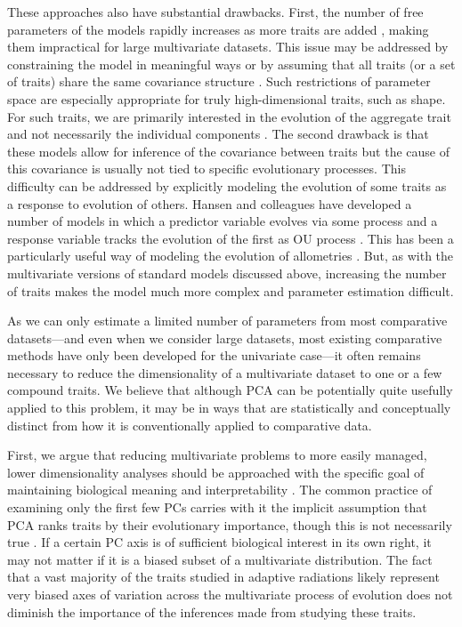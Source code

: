 \documentclass[a4paper,11pt]{article}
\begin{document}
These approaches also have substantial drawbacks. First, the number of free parameters of the models rapidly increases as more traits are added \citep{RevellHarmon2008}, making them impractical for large multivariate datasets. This issue may be addressed by constraining the model in meaningful ways \citep{ButlerKing2004} or by assuming that all traits (or a set of traits) share the same covariance structure \citep{Klingenberg2013, Adams2014, Adams2014b}. Such restrictions of parameter space are especially appropriate for truly high-dimensional traits, such as shape. For such traits, we are primarily interested in the evolution of the aggregate trait and not necessarily the individual components \citep{Adams2014}. The second drawback is that these models allow for inference of the covariance between traits but the cause of this covariance is usually not tied to specific evolutionary processes. This difficulty can be addressed by explicitly modeling the evolution of some traits as a response to evolution of others. Hansen and colleagues have developed a number of models in which a predictor variable evolves via some process and a response variable tracks the evolution of the first as OU process \citep{Hansen2008, Hansen2012SysBio, Bartoszek2012}. This has been a particularly useful way of modeling the evolution of allometries \citep[e.g.,][]{Hansen2012SysBio, Voje2013, Bolstad2014}. But, as with the multivariate versions of standard models discussed above, increasing the number of traits makes the model much more complex and parameter estimation difficult.

As we can only estimate a limited number of parameters from most comparative datasets---and even when we consider large datasets, most existing comparative methods have only been developed for the univariate case---it often remains necessary to reduce the dimensionality of a multivariate dataset to one or a few compound traits. We believe that although PCA can be potentially quite usefully applied to this problem, it may be in ways that are statistically and conceptually distinct from how it is conventionally applied to comparative data. 

First, we argue that reducing multivariate problems to more easily managed, lower dimensionality analyses should be approached with the specific goal of maintaining biological meaning and interpretability \citep{Houle2011}. The common practice of examining only the first few PCs carries with it the implicit assumption that PCA ranks traits by their evolutionary importance, though this is not necessarily true \citep{Polly2013}. If a certain PC axis is of sufficient biological interest in its own right, it may not matter if it is a biased subset of a multivariate distribution. The fact that a vast majority of the traits studied in adaptive radiations likely represent very biased axes of variation across the multivariate process of evolution does not diminish the importance of the inferences made from studying these traits. 
\end{document}
